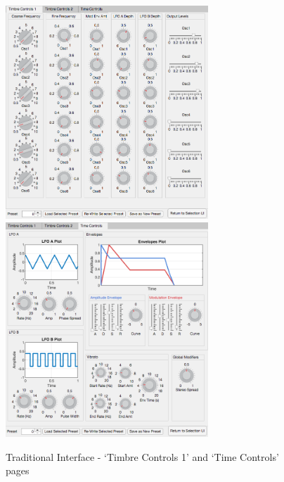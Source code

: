 \documentclass[11pt, oneside]{report}   	%
\begin{document}
\begin{figure}[h!] 
	\vspace{-5pt}
	\centering
	\hspace*{-0.2cm}
\includegraphics[width = 3in]{TraditionalUI1.png}
\hspace*{0.2cm}
	\includegraphics[width = 3in]{TraditionalUI3.png}
	\caption{Traditional Interface - `Timbre Controls 1' and `Time Controls' pages}
	\label{fig:TraditionalInterface}
	\vspace{-20pt}
\end{figure}
\end{document}
